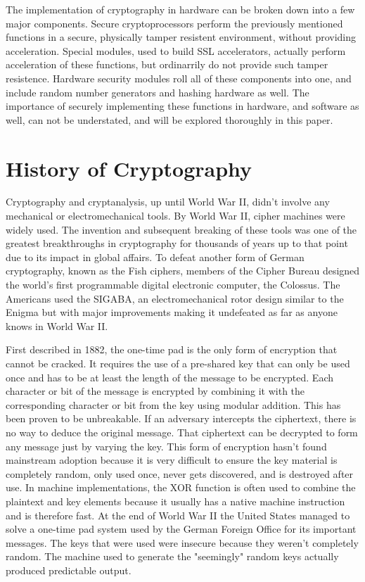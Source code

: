\documentclass[journal]{IEEEtran}
\begin{document}
The implementation of cryptography in hardware can be broken down into a few major components.  Secure cryptoprocessors perform the previously mentioned functions in a secure, physically tamper resistent environment, without providing acceleration.  Special modules, used to build SSL accelerators, actually perform acceleration of these functions, but ordinarrily do not provide such tamper resistence.  Hardware security modules roll all of these components into one, and include random number generators and hashing hardware as well.  The importance of securely implementing these functions in hardware, and software as well, can not be understated, and will be explored thoroughly in this paper.


\section{History of Cryptography}

Cryptography and cryptanalysis, up until World War II, didn't involve any mechanical or electromechanical tools.  By World War II, cipher machines were widely used.  The invention and subsequent breaking of these tools was one of the greatest breakthroughs in cryptography for thousands of years up to that point due to its impact in global affairs.  To defeat another form of German cryptography, known as the Fish ciphers, members of the Cipher Bureau designed the world's first programmable digital electronic computer, the Colossus.  The Americans used the SIGABA, an electromechanical rotor design similar to the Enigma but with major improvements making it undefeated as far as anyone knows in World War II.


First described in 1882, the one-time pad is the only form of encryption that cannot be cracked.  It requires the use of a pre-shared key that can only be used once and has to be at least the length of the message to be encrypted.  Each character or bit of the message is encrypted by combining it with the corresponding character or bit from the key using modular addition.  This has been proven to be unbreakable.  If an adversary intercepts the ciphertext, there is no way to deduce the original message.  That ciphertext can be decrypted to form any message just by varying the key.  This form of encryption hasn't found mainstream adoption because it is very difficult to ensure the key material is completely random, only used once, never gets discovered, and is destroyed after use.  In machine implementations, the XOR function is often used to combine the plaintext and key elements because it usually has a native machine instruction and is therefore fast.  At the end of World War II the United States managed to solve a one-time pad system used by the German Foreign Office for its important messages.  The keys that were used were insecure because they weren't completely random.  The machine used to generate the "seemingly" random keys actually produced predictable output.
\end{document}
